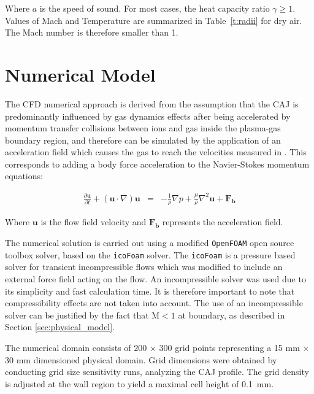 \documentclass[a4paper]{iacas}%
\begin{document}
Where $a$ is the speed of sound. For most cases, the heat capacity ratio $\gamma \geq 1$. %
Values of Mach and Temperature are summarized in Table~\ref{t:radii} for dry air. The Mach number is therefore smaller than 1.

\clearpage 

\section{Numerical Model}

The CFD numerical approach is derived from the assumption that the CAJ is predominantly influenced by gas dynamics effects after being accelerated by momentum transfer collisions between ions and gas inside the plasma-gas boundary region, and therefore can be simulated by the application of an acceleration field which causes the gas to reach the velocities measured in \cite{KR}. This corresponds to adding a body force acceleration to the Navier-Stokes momentum equations:

\begin{eqnarray}
\label{eqn:NS-Force}
\frac{\partial \boldsymbol{u}}{\partial t} + (\boldsymbol{u} \cdot \nabla)\boldsymbol{u} &=& -\frac{1}{\rho}\nabla p + \frac{\mu}{\rho} \nabla^2 \boldsymbol{u} + \boldsymbol{F_b}
\end{eqnarray}

Where $\boldsymbol{u}$ is the flow field velocity and $\boldsymbol{F_b}$ represents the acceleration field.

The numerical solution is carried out using a modified \texttt{OpenFOAM} \cite{OPENFOAM} open source toolbox solver, based on the \texttt{icoFoam} solver. The \texttt{icoFoam} is a pressure based solver for transient incompressible flows which was modified to include an external force field acting on the flow. An incompressible solver was used due to its simplicity and fast calculation time. It is therefore important to note that compressibility effects are not taken into account. The use of an incompressible solver can be justified by the fact that $\mathrm{M} < 1$ at boundary, as described in Section \ref{sec:physical_model}.

The numerical domain consists of 200 $\times$ 300 grid points representing a 15 mm $\times$ 30 mm dimensioned physical domain. Grid dimensions were obtained by conducting grid size sensitivity runs, analyzing the CAJ profile. The grid density is adjusted at the wall region to yield a maximal cell height of 0.1~mm. 
\end{document}
